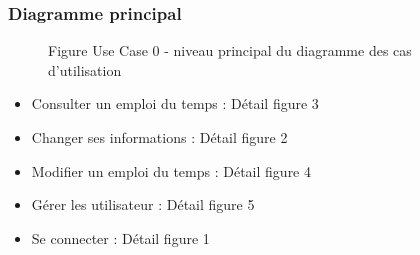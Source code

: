 \documentclass[a4paper, 11pt]{article}
\begin{document}
        \subsubsection{ Diagramme principal}
        \begin{figure}[h]
        \caption{Figure Use Case 0 - niveau principal du diagramme des cas d'utilisation}
        \label{fig-diag-use-case-0}
        \end{figure}
        \begin{itemize}
        \item Consulter un emploi du temps : Détail figure 3
        \item Changer ses informations     : Détail figure 2
        \item Modifier un emploi du temps  : Détail figure 4
        \item Gérer les utilisateur        : Détail figure 5
        \item Se connecter                 : Détail figure 1
        \end{itemize}
	\clearpage
\end{document}
